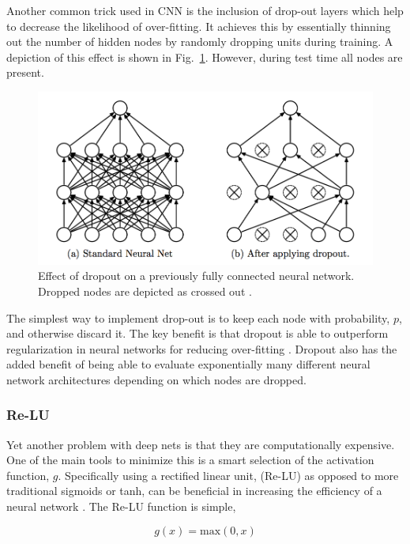 \documentclass[12pt, twocolumn]{article}
\begin{document}
Another common trick used in CNN is the inclusion of drop-out layers which help to decrease the likelihood of over-fitting. It achieves this by essentially thinning out the number of hidden nodes by randomly dropping units during training.  A depiction of this effect is shown in Fig.~\ref{fig:dropout}. However, during test time all nodes are present. 
\begin{figure}
\includegraphics[scale=.52]{dropout.png}

\caption{Effect of dropout on a previously fully connected neural network. Dropped nodes are depicted as crossed out \cite{Dropout}. }
\label{fig:dropout}
\end{figure}

The simplest way to implement drop-out is to keep each node with probability, $p$, and otherwise discard it. The key benefit is that dropout is able to outperform regularization in neural networks for reducing over-fitting \cite{Dropout}. Dropout also has the added benefit of being able to evaluate exponentially many different neural network architectures depending on which nodes are dropped.
 
\subsubsection{Re-LU}

Yet another problem with deep nets is that they are computationally expensive. One of the main tools to minimize this is a smart selection of the activation function, $g$. Specifically using a rectified linear unit, (Re-LU) as opposed to more traditional sigmoids or tanh, can be beneficial in increasing the efficiency of a neural network \cite{imagenet}. The Re-LU function is simple, 

\begin{equation}
g(x)= \textrm{max}(0,x)
\end{equation}
\end{document}
